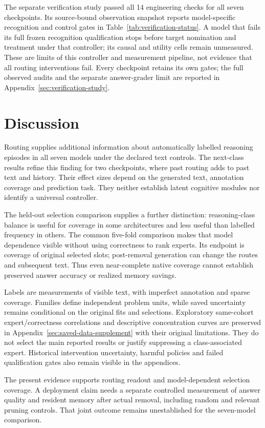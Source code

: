 The separate verification study passed all 14 engineering checks for all
seven checkpoints. Its source-bound observation snapshot reports
model-specific recognition and control gates in
Table~\ref{tab:verification-status}. A model that
fails its full frozen recognition qualification stops before target
nomination and treatment under that controller; its causal and utility
cells remain unmeasured. These are limits of this controller and measurement
pipeline, not evidence that all routing interventions fail. Every checkpoint
retains its own gates; the full observed audits and the separate answer-grader
limit are reported in Appendix~\ref{sec:verification-study}.

\section{Discussion}

Routing supplies additional information about automatically labelled
reasoning episodes in all seven models under the declared text controls.
The next-class results refine this finding for two checkpoints, where
past routing adds to past text and history. Their effect sizes depend on
the generated text, annotation coverage and prediction task. They neither
establish latent cognitive modules nor identify a universal controller.

The held-out selection comparison supplies a further distinction:
reasoning-class balance is useful for coverage in some architectures and
less useful than labelled frequency in others. The common five-fold
comparison makes that model dependence visible without using correctness
to rank experts. Its endpoint is coverage of original selected slots;
post-removal generation can change the routes and subsequent text.
Thus even near-complete native coverage cannot establish preserved answer
accuracy or realized memory savings.

Labels are measurements of visible text, with imperfect annotation and
sparse coverage. Families define independent problem units, while saved
uncertainty remains conditional on the original fits and selections.
Exploratory same-cohort expert/correctness correlations and descriptive
concentration curves are preserved in Appendix~\ref{sec:saved-data-supplement}
with their original limitations. They do not select the main reported
results or justify suppressing a class-associated expert. Historical
intervention uncertainty, harmful policies and failed qualification gates
also remain visible in the appendices.

The present evidence supports routing readout and model-dependent
selection coverage. A deployment claim needs a separate controlled
measurement of answer quality and resident memory after actual removal,
including random and relevant pruning controls. That joint outcome
remains unestablished for the seven-model comparison.
